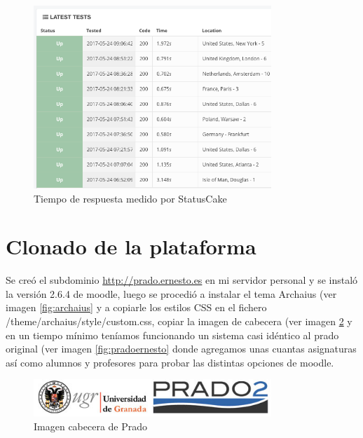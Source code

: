 \begin{figure}[H]
\centering
\includegraphics[width=0.8\textwidth]{../screenshots/statuscake2}
\caption{Tiempo de respuesta medido por StatusCake}
\label{fig:statuscake2}
\end{figure}


\section{Clonado de la plataforma}

Se creó el subdominio \url{http://prado.ernesto.es} en mi servidor personal y se instaló la versión 2.6.4 de moodle, luego se procedió a instalar el tema Archaius  (ver imagen \ref{fig:archaius} y a copiarle los estilos CSS en el fichero /theme/archaius/style/custom.css, copiar la imagen de cabecera (ver imagen \ref{fig:cabeceraprado} y en un tiempo mínimo teníamos funcionando un sistema casi idéntico al prado original (ver imagen \ref{fig:pradoernesto} donde agregamos unas cuantas asignaturas así como alumnos y profesores para probar las distintas opciones de moodle.

\begin{figure}[H]
\centering
\includegraphics[width=0.8\textwidth]{../screenshots/cabeceraprado}
\caption{Imagen cabecera de Prado}
\label{fig:cabeceraprado}
\end{figure}

